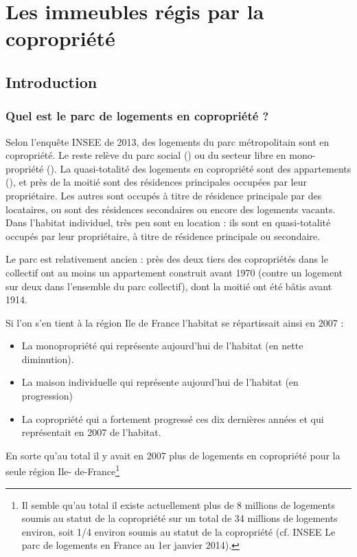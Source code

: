 \chapter{Les immeubles régis par la copropriété}

\section*{Introduction}
	
	\subsection{Quel est le parc de logements en copropriété ?}
	
	Selon l’enquête INSEE de 2013,  des logements du parc métropolitain sont en copropriété. Le reste
	relève du parc social () ou du secteur libre en mono-propriété (). La quasi-totalité des
	logements en copropriété sont des appartements (), et près de la moitié sont des résidences
	principales occupées par leur propriétaire. Les autres sont occupés à titre de résidence principale par des
	locataires, ou sont des résidences secondaires ou encore des logements vacants. Dans l’habitat individuel,
	très peu sont en location : ils sont en quasi-totalité occupés par leur propriétaire, à titre de résidence
	principale ou secondaire.
	
	Le parc est relativement ancien : près des deux tiers des copropriétés dans le collectif ont au moins un
	appartement construit avant 1970 (contre un logement sur deux dans l’ensemble du parc collectif), dont
	la moitié ont été bâtis avant 1914.
	
	Si l’on s’en tient à la région Ile de France l’habitat se répartissait ainsi en 2007 :
	\begin{itemize}
		\item La monopropriété qui représente aujourd’hui  de l’habitat (en nette diminution).
		\item La maison individuelle qui représente aujourd’hui  de l’habitat (en progression)
		\item La copropriété qui a fortement progressé ces dix dernières années et qui représentait en 2007
	 de l’habitat.
	\end{itemize}
	
	En sorte qu’au total il y avait en 2007 plus de  logements en copropriété pour la seule région Ile-
	de-France\footnote{Il semble qu’au total il existe actuellement plus de 8 millions de logements soumis au statut de la copropriété sur un total de 34	millions de logements environ, soit 1/4 environ soumis au statut de la copropriété (cf. INSEE Le parc de logements en France au 1er janvier	2014).}
	
